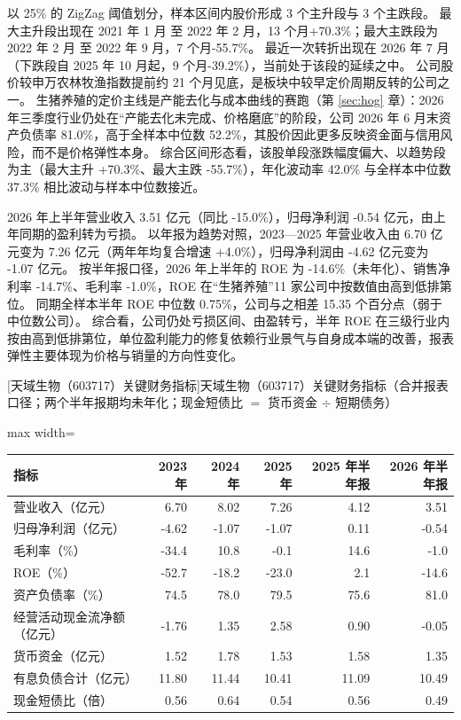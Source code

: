  以 25\% 的 ZigZag 阈值划分，样本区间内股价形成 3 个主升段与 3 个主跌段。 最大主升段出现在 2021 年 1 月 至 2022 年 2 月，13 个月+70.3\%；最大主跌段为 2022 年 2 月 至 2022 年 9 月，7 个月-55.7\%。 最近一次转折出现在 2026 年 7 月（下跌段自 2025 年 10 月起，9 个月-39.2\%），当前处于该段的延续之中。 公司股价较申万农林牧渔指数提前约 21 个月见底，是板块中较早定价周期反转的公司之一。 生猪养殖的定价主线是产能去化与成本曲线的赛跑（第 \ref{sec:hog} 章）：2026 年三季度行业仍处在“产能去化未完成、价格磨底”的阶段，公司 2026 年 6 月末资产负债率 81.0\%，高于全样本中位数 52.2\%，其股价因此更多反映资金面与信用风险，而不是价格弹性本身。 综合区间形态看，该股单段涨跌幅度偏大、以趋势段为主（最大主升 +70.3\%、最大主跌 -55.7\%），年化波动率 42.0\% 与全样本中位数 37.3\% 相比波动与样本中位数接近。

 2026 年上半年营业收入 3.51 亿元（同比 -15.0\%），归母净利润 -0.54 亿元，由上年同期的盈利转为亏损。 以年报为趋势对照，2023---2025 年营业收入由 6.70 亿元变为 7.26 亿元（两年年均复合增速 +4.0\%），归母净利润由 -4.62 亿元变为 -1.07 亿元。 按半年报口径，2026 年上半年的 ROE 为 -14.6\%（未年化）、销售净利率 -14.7\%、毛利率 -1.0\%，ROE 在“生猪养殖”11 家公司中按数值由高到低排第位。 同期全样本半年 ROE 中位数 0.75\%，公司与之相差 15.35 个百分点（弱于中位数公司）。 综合看，公司仍处亏损区间、由盈转亏，半年 ROE 在三级行业内按由高到低排第位，单位盈利能力的修复依赖行业景气与自身成本端的改善，报表弹性主要体现为价格与销量的方向性变化。

\begin{center}\small\setlength{\tabcolsep}{3.4pt}
[天域生物（603717）关键财务指标]{天域生物（603717）关键财务指标（合并报表口径；两个半年报期均未年化；现金短债比 $=$ 货币资金 $\div$ 短期债务）}
\begin{adjustbox}{max width=\textwidth}
\begin{tabular}{@{}lrrrrr@{}}
\toprule
指标 & 2023 年 & 2024 年 & 2025 年 & 2025 年半年报 & 2026 年半年报 \\
\midrule
营业收入（亿元） & 6.70 & 8.02 & 7.26 & 4.12 & 3.51 \\
归母净利润（亿元） & -4.62 & -1.07 & -1.07 & 0.11 & -0.54 \\
毛利率（\%） & -34.4 & 10.8 & -0.1 & 14.6 & -1.0 \\
ROE（\%） & -52.7 & -18.2 & -23.0 & 2.1 & -14.6 \\
资产负债率（\%） & 74.5 & 78.0 & 79.5 & 75.6 & 81.0 \\
经营活动现金流净额（亿元） & -1.76 & 1.35 & 2.58 & 0.90 & -0.05 \\
货币资金（亿元） & 1.52 & 1.78 & 1.53 & 1.58 & 1.35 \\
有息负债合计（亿元） & 11.80 & 11.44 & 10.41 & 11.09 & 10.49 \\
现金短债比（倍） & 0.56 & 0.64 & 0.54 & 0.56 & 0.49 \\
\bottomrule
\end{tabular}
\end{adjustbox}
\end{center}

